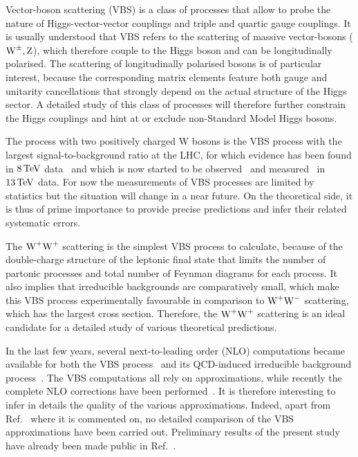 Vector-boson scattering (VBS) is a class of processes that allow to probe the nature of Higgs-vector-vector couplings and triple and quartic gauge couplings.
It is usually understood that VBS refers to the scattering of massive vector-bosons ($\text{W}^\pm,\text{Z}$), which therefore couple to the Higgs boson and can be longitudinally polarised.
The scattering of longitudinally polarised bosons is of particular interest, because the corresponding matrix elements feature both gauge and unitarity cancellations that strongly depend on the actual structure of the Higgs sector.
A detailed study of this class of processes will therefore further constrain the Higgs couplings and hint at or exclude non-Standard Model Higgs bosons.

The process with two positively charged W bosons is the VBS process with the largest signal-to-background ratio at the LHC, for which evidence has been found in $8 \,\text{TeV}$ data~\cite{Aad:2014zda,Khachatryan:2014sta} and which is now started to be observed~\cite{Sirunyan:2017ret} and measured~\cite{Aaboud:2016ffv} in $13\,\text{TeV}$ data.
For now the measurements of VBS processes are limited by statistics but the situation will change in a near future.
On the theoretical side, it is thus of prime importance to provide precise predictions and infer their related systematic errors.

The $\text{W}^+\text{W}^+$ scattering is the simplest VBS process to calculate, because of the double-charge structure of the leptonic final state that limits the number of partonic processes and total number of Feynman diagrams for each process.
It also implies that irreducible backgrounds are comparatively small, which make this VBS process experimentally favourable in comparison to \eg $\text{W}^+\text{W}^-$ scattering, which has the largest cross section.
Therefore, the $\text{W}^+\text{W}^+$ scattering is an ideal candidate for a detailed study of various theoretical predictions.

In the last few years, several next-to-leading order (NLO) computations became available for both the VBS process~\cite{Jager:2006zc,Jager:2006cp,Bozzi:2007ur,Jager:2009xx,Jager:2011ms,Denner:2012dz,Rauch:2016pai} and its QCD-induced irreducible background process~\cite{Rauch:2016pai,Melia:2010bm,Melia:2011gk,Campanario:2013gea,Baglio:2014uba}.
The VBS computations all rely on approximations, while recently the complete NLO corrections have been performed~\cite{Biedermann:2017bss}.
It is therefore interesting to infer in details the quality of the various approximations.
Indeed, apart from Ref.~\cite{Biedermann:2017bss} where it is commented on,  no detailed comparison of the VBS approximations have been carried out.
Preliminary results of the present study have already been made public in Ref.~\cite{Anders:2018gfr}.

